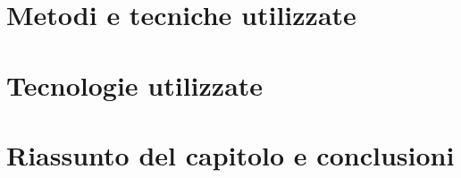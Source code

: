 \section{Metodi e tecniche utilizzate}

%
%

\section{Tecnologie utilizzate}

%
%

\section{Riassunto del capitolo e conclusioni}

